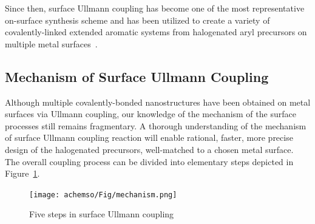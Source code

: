 \documentclass[journal=jacsat,manuscript=article]{achemso}
\begin{document}
Since then, surface Ullmann coupling has become one of the most representative on-surface synthesis scheme and has been utilized to create a variety of covalently-linked extended aromatic systems from halogenated aryl precursors on multiple metal surfaces~\cite{RZK-reviews}.


\subsection{Mechanism of Surface Ullmann Coupling}

Although multiple covalently-bonded nanostructures have been obtained on metal surfaces via Ullmann coupling, our knowledge of the mechanism of the surface processes still remains fragmentary. 
%
A thorough understanding of the mechanism of surface Ullmann coupling reaction will enable rational, faster, more precise design of the halogenated precursors, well-matched to a chosen metal surface.
%
The overall coupling process can be divided into elementary steps depicted in Figure~\ref{fig_mecha}.

\begin{figure}[ht]
\centering
\texttt{[image: achemso/Fig/mechanism.png]}
\caption{Five steps in surface Ullmann coupling}
\label{fig_mecha}
\end{figure}

\end{document}
